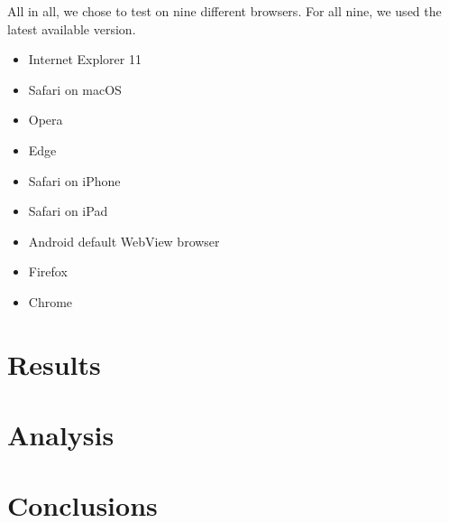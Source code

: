 \documentclass[conference]{IEEEtran}
\begin{document}
All in all, we chose to test on nine different browsers. For all nine, we used the latest available version.

\begin{itemize}
  \item Internet Explorer 11
  \item Safari on macOS
  \item Opera
  \item Edge
  \item Safari on iPhone
  \item Safari on iPad
  \item Android default WebView browser
  \item Firefox
  \item Chrome
\end{itemize}

\section{Results}
\section{Analysis}
\section{Conclusions}



\end{document}
